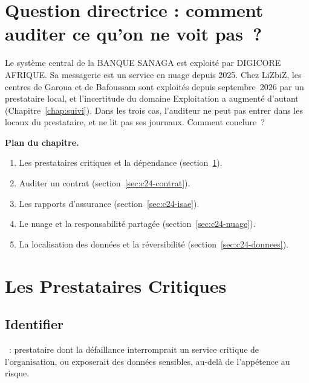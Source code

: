 \bigskip

\section*{Question directrice : comment auditer ce qu'on ne voit pas~?}

Le système central de la BANQUE SANAGA est exploité par DIGICORE AFRIQUE.
Sa messagerie est un service en nuage depuis 2025. Chez LiZbiZ, les centres
de Garoua et de Bafoussam sont exploités depuis septembre~2026 par un
prestataire local, et l'incertitude du domaine Exploitation a augmenté
d'autant (Chapitre~\ref{chap:suivi}). Dans les trois cas, l'auditeur ne peut
pas entrer dans les locaux du prestataire, et ne lit pas ses journaux.
Comment conclure~?

\medskip
\textbf{Plan du chapitre.}
\begin{enumerate}
    \item Les prestataires critiques et la dépendance
          (section~\ref{sec:c24-critiques}).
    \item Auditer un contrat (section~\ref{sec:c24-contrat}).
    \item Les rapports d'assurance (section~\ref{sec:c24-isae}).
    \item Le nuage et la responsabilité partagée (section~\ref{sec:c24-nuage}).
    \item La localisation des données et la réversibilité
          (section~\ref{sec:c24-donnees}).
\end{enumerate}

\separateur

\section{Les Prestataires Critiques}
\label{sec:c24-critiques}

\subsection{Identifier}

\begin{boxdef}
~: prestataire
dont la défaillance interromprait un service critique de l'organisation,
ou exposerait des données sensibles, au-delà de l'appétence au risque.
\end{boxdef}

